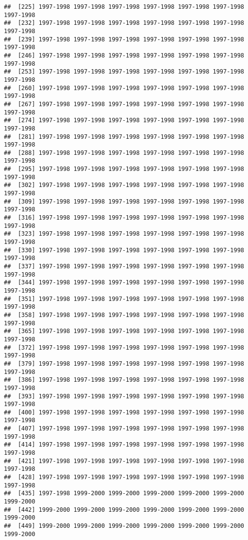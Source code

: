 \documentclass[
]{article}
\begin{document}
\begin{verbatim}
##  [225] 1997-1998 1997-1998 1997-1998 1997-1998 1997-1998 1997-1998 1997-1998
##  [232] 1997-1998 1997-1998 1997-1998 1997-1998 1997-1998 1997-1998 1997-1998
##  [239] 1997-1998 1997-1998 1997-1998 1997-1998 1997-1998 1997-1998 1997-1998
##  [246] 1997-1998 1997-1998 1997-1998 1997-1998 1997-1998 1997-1998 1997-1998
##  [253] 1997-1998 1997-1998 1997-1998 1997-1998 1997-1998 1997-1998 1997-1998
##  [260] 1997-1998 1997-1998 1997-1998 1997-1998 1997-1998 1997-1998 1997-1998
##  [267] 1997-1998 1997-1998 1997-1998 1997-1998 1997-1998 1997-1998 1997-1998
##  [274] 1997-1998 1997-1998 1997-1998 1997-1998 1997-1998 1997-1998 1997-1998
##  [281] 1997-1998 1997-1998 1997-1998 1997-1998 1997-1998 1997-1998 1997-1998
##  [288] 1997-1998 1997-1998 1997-1998 1997-1998 1997-1998 1997-1998 1997-1998
##  [295] 1997-1998 1997-1998 1997-1998 1997-1998 1997-1998 1997-1998 1997-1998
##  [302] 1997-1998 1997-1998 1997-1998 1997-1998 1997-1998 1997-1998 1997-1998
##  [309] 1997-1998 1997-1998 1997-1998 1997-1998 1997-1998 1997-1998 1997-1998
##  [316] 1997-1998 1997-1998 1997-1998 1997-1998 1997-1998 1997-1998 1997-1998
##  [323] 1997-1998 1997-1998 1997-1998 1997-1998 1997-1998 1997-1998 1997-1998
##  [330] 1997-1998 1997-1998 1997-1998 1997-1998 1997-1998 1997-1998 1997-1998
##  [337] 1997-1998 1997-1998 1997-1998 1997-1998 1997-1998 1997-1998 1997-1998
##  [344] 1997-1998 1997-1998 1997-1998 1997-1998 1997-1998 1997-1998 1997-1998
##  [351] 1997-1998 1997-1998 1997-1998 1997-1998 1997-1998 1997-1998 1997-1998
##  [358] 1997-1998 1997-1998 1997-1998 1997-1998 1997-1998 1997-1998 1997-1998
##  [365] 1997-1998 1997-1998 1997-1998 1997-1998 1997-1998 1997-1998 1997-1998
##  [372] 1997-1998 1997-1998 1997-1998 1997-1998 1997-1998 1997-1998 1997-1998
##  [379] 1997-1998 1997-1998 1997-1998 1997-1998 1997-1998 1997-1998 1997-1998
##  [386] 1997-1998 1997-1998 1997-1998 1997-1998 1997-1998 1997-1998 1997-1998
##  [393] 1997-1998 1997-1998 1997-1998 1997-1998 1997-1998 1997-1998 1997-1998
##  [400] 1997-1998 1997-1998 1997-1998 1997-1998 1997-1998 1997-1998 1997-1998
##  [407] 1997-1998 1997-1998 1997-1998 1997-1998 1997-1998 1997-1998 1997-1998
##  [414] 1997-1998 1997-1998 1997-1998 1997-1998 1997-1998 1997-1998 1997-1998
##  [421] 1997-1998 1997-1998 1997-1998 1997-1998 1997-1998 1997-1998 1997-1998
##  [428] 1997-1998 1997-1998 1997-1998 1997-1998 1997-1998 1997-1998 1997-1998
##  [435] 1997-1998 1999-2000 1999-2000 1999-2000 1999-2000 1999-2000 1999-2000
##  [442] 1999-2000 1999-2000 1999-2000 1999-2000 1999-2000 1999-2000 1999-2000
##  [449] 1999-2000 1999-2000 1999-2000 1999-2000 1999-2000 1999-2000 1999-2000

\end{verbatim}
\end{document}

